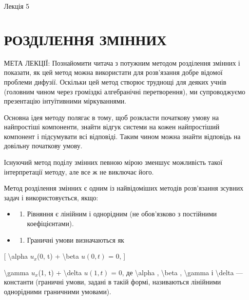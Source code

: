 \documentclass[
]{article}
\providecommand{\tightlist}{%
  \setlength{\itemsep}{0pt}\setlength{\parskip}{0pt}}
\begin{document}
Лекція 5

\section{РОЗДІЛЕННЯ
ЗМІННИХ}\label{ux440ux43eux437ux434ux456ux43bux435ux43dux43dux44f-ux437ux43cux456ux43dux43dux438ux445}

МЕТА ЛЕКЦІЇ: Познайомити читача з потужним методом розділення змінних і
показати, як цей метод можна використати для розв'язання добре відомої
проблеми дифузії. Оскільки цей метод створює труднощі для деяких учнів
(головним чином через громіздкі алгебранічні перетворення), ми
супроводжуємо презентацію інтуїтивними міркуваннями.

Основна ідея методу полягає в тому, щоб розкласти початкову умову на
найпростіші компоненти, знайти відгук системи на кожен найпростіший
компонент і підсумувати всі відповіді. Таким чином можна знайти
відповідь на довільну початкову умову.

Існуючий метод поділу змінних певною мірою зменшує можливість такої
інтерпретації методу, але все ж не виключає його.

Метод розділення змінних є одним із найвідоміших методів розв'язання
зсувних задач і використовується, якщо:

\begin{itemize}
\tightlist
\item
  \begin{enumerate}
  \def\labelenumi{\arabic{enumi}.}
  \tightlist
  \item
    Рівняння є лінійним і однорідним (не обов'язково з постійними
    коефіцієнтами).
  \end{enumerate}
\item
  \begin{enumerate}
  \def\labelenumi{\arabic{enumi}.}
  \setcounter{enumi}{1}
  \tightlist
  \item
    Граничні умови визначаються як
  \end{enumerate}
\end{itemize}

{[} \textbackslash alpha \(u_x\)(0, t) + \textbackslash beta \(u(0, t)\)
= 0, {]}

\textbackslash gamma \(u_x\)(1, t) + \textbackslash delta \(u(1, t)\) =
0, де \textbackslash alpha , \textbackslash beta , \textbackslash gamma
і \textbackslash delta --- константи (граничні умови, задані в такій
формі, називаються лінійними однорідними граничними умовами).
\end{document}
